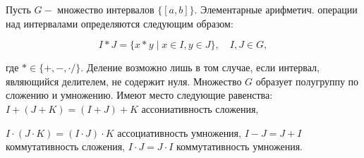 \documentclass[10pt]{article}
\begin{document}
Пусть $G-$ множество интервалов $\{[a, b]\}$. Элементарные арифметич. операции над интервалами определяются следующим образом:



\[

I * J=\{x * y \mid x \in I, y \in J\}, \quad I, J \in G,

\]



где $* \in\{+,-, \cdot /\}$. Деление возможно лишь в том случае, если интервал, являющийся делителем, не содержит нуля. Множество $G$ образует полугруппу по сложению и умножению. Имеют место следующие равенства: $I+(J+K)=(I+J)+K$ ассониативность сложения,



$I \cdot(J \cdot K)=(I \cdot J) \cdot K$ ассоциативность умножения, $I-J=J+I$ коммутативность сложения, $I \cdot J=J \cdot I$ коммутативность умножения.
\end{document}
